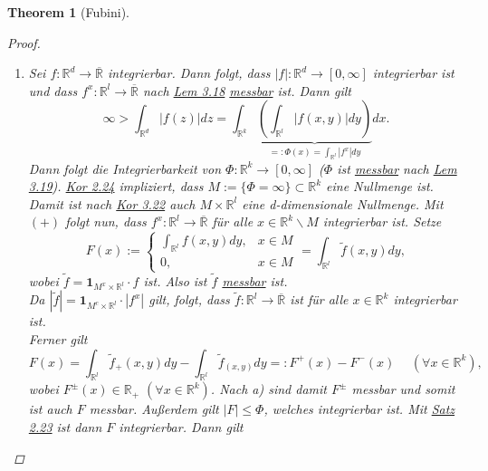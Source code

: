 \documentclass[a4paper]{scrreprt}
\newcommand{\doubleOne}{\textbf{1}}
\newcommand{\R}{\mathbb{R}}
\newcommand{\Rq}{\overline{\R}}
\newcommand{\jhyperref}[2]{\hyperref[j_#1]{#2}}
\newcommand{\jlink}[1]{\jhyperref{#1}{#1}}
\newcommand{\jabb}[3]{ #1: #2 \rightarrow #3 }
\theoremstyle{plain}
\newtheorem{thm}{Theorem}[chapter]
\theoremstyle{definition}
\begin{document}
{{{{\begin{thm}[Fubini]
\begin{proof}
\begin{enumerate}
            \item
                Sei $\jabb{f}{\R^d}{\Rq}$ integrierbar. Dann folgt, dass $\jabb{|f|}{\R^d}{[0,\infty]}$ integrierbar ist und dass $\jabb{f^x}{\R^l}{\Rq}$ nach \jlink{Lem 3.18} \jlink{messbar} ist. Dann gilt
                \begin{displaymath}
                    \tag{$+$}
                    \infty > \int_{\R^d} |f(z)| dz = \int_{\R^k} \underbrace{\left(\int_{\R^l} |f(x,y)|dy \right)}_{=: \Phi(x) = \int_{\R^l} |f^x|dy}dx.
                \end{displaymath}
                Dann folgt die Integrierbarkeit von $\jabb{\Phi}{\R^k}{[0,\infty]}$ ($\Phi$ ist \jlink{messbar} nach \jlink{Lem 3.19}). \jlink{Kor 2.24} impliziert, dass $M:= \{\Phi = \infty\} \subset \R^k$ eine Nullmenge ist. Damit ist nach \jlink{Kor 3.22} auch $M\times \R^l$ eine d-dimensionale Nullmenge. Mit $(+)$ folgt nun, dass $\jabb{f^x}{\R^l}{\Rq}$ für alle $x\in\R^k\backslash M$ integrierbar ist. Setze
                \begin{displaymath}
                    \tag{$*$}
                    F(x) := \begin{cases}
                                \int_{\R^l} f(x,y)dy, &x\in M\\
                                0, &x\in M
                            \end{cases}
                         = \int_{\R^l} \tilde{f}(x,y)dy,
                \end{displaymath}
                wobei $\tilde{f} = \doubleOne_{M^x\times \R^l} \cdot f$ ist. Also ist $\tilde{f}$ \jlink{messbar} ist.\\
                Da $|\tilde{f}| = \doubleOne_{M^c\times \R^l}\cdot |f^x|$ gilt,  folgt, dass $\jabb{\tilde{f}}{\R^l}{\Rq}$ ist für alle $x\in \R^k$ integrierbar ist.\\
                Ferner gilt
                \begin{displaymath}
                    F(x) = \int_{\R^l} \tilde{f}_+(x,y)dy - \int_{\R^l} \tilde{f}_(x,y)dy =: F^+(x) - F^-(x) \hspace{15pt} (\forall x\in \R^k),
                \end{displaymath}
                wobei $F^\pm(x) \in \R_+$ $(\forall x\in\R^k)$. Nach a) sind damit $F^\pm$ messbar und somit ist auch $F$ messbar. Außerdem gilt $|F| \le \Phi$, welches integrierbar ist. Mit \jlink{Satz 2.23} ist dann $F$ integrierbar. Dann gilt
                \begin{displaymath}

\end{displaymath}
\end{enumerate}
\end{proof}
\end{thm}}}}}
\end{document}
